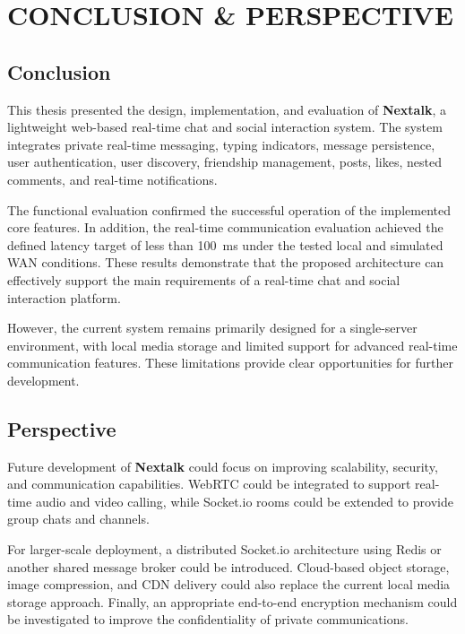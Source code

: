 \documentclass[12pt, a4paper]{article}
\begin{document}
\newpage

\section{CONCLUSION \& PERSPECTIVE}

\subsection{Conclusion}

This thesis presented the design, implementation, and evaluation of
\textbf{Nextalk}, a lightweight web-based real-time chat and social
interaction system. The system integrates private real-time messaging,
typing indicators, message persistence, user authentication, user
discovery, friendship management, posts, likes, nested comments, and
real-time notifications.

The functional evaluation confirmed the successful operation of the
implemented core features. In addition, the real-time communication
evaluation achieved the defined latency target of less than 100~ms under
the tested local and simulated WAN conditions. These results demonstrate
that the proposed architecture can effectively support the main
requirements of a real-time chat and social interaction platform.

However, the current system remains primarily designed for a
single-server environment, with local media storage and limited support
for advanced real-time communication features. These limitations provide
clear opportunities for further development.

\subsection{Perspective}

Future development of \textbf{Nextalk} could focus on improving
scalability, security, and communication capabilities. WebRTC could be
integrated to support real-time audio and video calling, while Socket.io
rooms could be extended to provide group chats and channels.

For larger-scale deployment, a distributed Socket.io architecture using
Redis or another shared message broker could be introduced. Cloud-based
object storage, image compression, and CDN delivery could also replace
the current local media storage approach. Finally, an appropriate
end-to-end encryption mechanism could be investigated to improve the
confidentiality of private communications.
\end{document}
